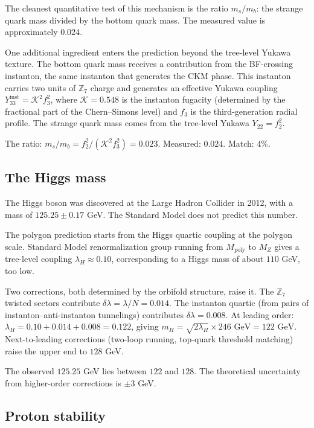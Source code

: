 The cleanest quantitative test of this mechanism is the ratio
$m_s/m_b$: the strange quark mass divided by the bottom quark mass.
The measured value is approximately $0.024$.

One additional ingredient enters the prediction beyond the tree-level
Yukawa texture. The bottom quark mass receives a contribution from
the BF-crossing instanton, the same instanton that generates the CKM
phase. This instanton carries two units of $\mathbb{Z}_7$ charge and
generates an effective Yukawa coupling
$Y_{33}^{\text{inst}} = \mathcal{K}^2 f_3^2$, where
$\mathcal{K} = 0.548$ is the instanton fugacity (determined by the
fractional part of the Chern--Simons level) and $f_3$ is the
third-generation radial profile. The strange quark mass comes from the
tree-level Yukawa $Y_{22} = f_2^2$.

The ratio:
$m_s/m_b = f_2^2/(\mathcal{K}^2 f_3^2) = 0.023$.
Measured: $0.024$. Match: $4\%$.

\subsection*{The Higgs mass}

The Higgs boson was discovered at the Large Hadron Collider in 2012,
with a mass of $125.25 \pm 0.17$ GeV. The Standard Model does not
predict this number.

The polygon prediction starts from the Higgs quartic coupling at the
polygon scale. Standard Model renormalization group running from
$M_{\text{poly}}$ to $M_Z$ gives a tree-level coupling
$\lambda_H \approx 0.10$, corresponding to a Higgs mass of about
$110$ GeV, too low.

Two corrections, both determined by the orbifold structure, raise it.
The $\mathbb{Z}_7$ twisted sectors contribute
$\delta\lambda = \lambda/N = 0.014$. The instanton quartic (from pairs
of instanton--anti-instanton tunnelings) contributes
$\delta\lambda = 0.008$. At leading order:
$\lambda_H = 0.10 + 0.014 + 0.008 = 0.122$, giving
$m_H = \sqrt{2\lambda_H} \times 246\text{ GeV} = 122\text{ GeV}$.
Next-to-leading corrections (two-loop running, top-quark threshold
matching) raise the upper end to $128$ GeV.

The observed $125.25$ GeV lies between $122$ and $128$. The theoretical
uncertainty from higher-order corrections is $\pm 3$ GeV.

\subsection*{Proton stability}

